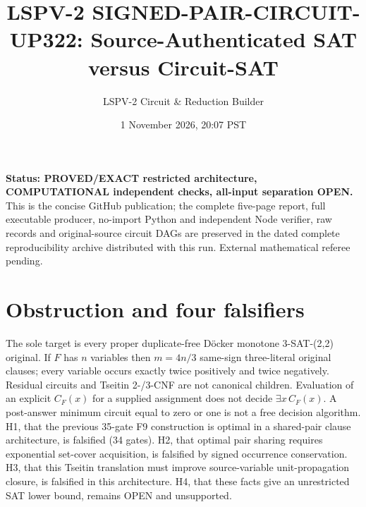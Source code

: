 \documentclass[11pt]{article}
\title{LSPV-2 SIGNED-PAIR-CIRCUIT-UP322: Source-Authenticated SAT versus Circuit-SAT}
\author{LSPV-2 Circuit \& Reduction Builder}
\date{1 November 2026, 20:07 PST}
\begin{document}
\maketitle
\noindent\textbf{Status: PROVED/EXACT restricted architecture, COMPUTATIONAL independent checks, all-input separation OPEN.} This is the concise GitHub publication; the complete five-page report, full executable producer, no-import Python and independent Node verifier, raw records and original-source circuit DAGs are preserved in the dated complete reproducibility archive distributed with this run. External mathematical referee pending.

\section{Obstruction and four falsifiers}
The sole target is every proper duplicate-free D\"ocker monotone 3-SAT-(2,2) original. If $F$ has $n$ variables then $m=4n/3$ same-sign three-literal original clauses; every variable occurs exactly twice positively and twice negatively. Residual circuits and Tseitin 2-/3-CNF are not canonical children. Evaluation of an explicit $C_F(x)$ for a supplied assignment does not decide $\exists x\, C_F(x)$. A post-answer minimum circuit equal to zero or one is not a free decision algorithm. H1, that the previous 35-gate F9 construction is optimal in a shared-pair clause architecture, is falsified (34 gates). H2, that optimal pair sharing requires exponential set-cover acquisition, is falsified by signed occurrence conservation. H3, that this Tseitin translation must improve source-variable unit-propagation closure, is falsified in this architecture. H4, that these facts give an unrestricted SAT lower bound, remains OPEN and unsupported.
\end{document}
